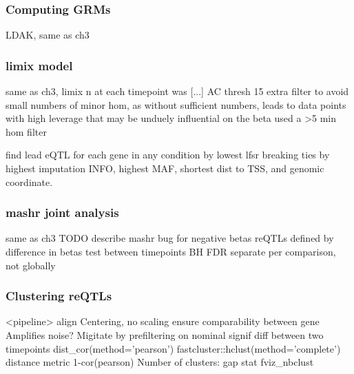 \begin{outline}
\subsubsection{Computing GRMs}

\1 LDAK, same as ch3

\subsubsection{limix model}

\1 same as ch3, limix
    \2 n at each timepoint was [...]
    \2 AC thresh 15
    \2 extra filter to avoid small numbers of minor hom, as without sufficient numbers, leads to data points with high leverage that may be unduely influential on the beta
    \2 used a >5 min hom filter

\1 find lead eQTL for each gene in any condition by lowest lfsr
    \2 breaking ties by highest imputation INFO, highest \gls{MAF}, shortest dist to \gls{TSS}, and genomic coordinate.

\subsubsection{mashr joint analysis}

\1 same as ch3
    \2 TODO describe mashr bug for negative betas
    \2 reQTLs defined by difference in betas test between timepoints
    \2 BH FDR separate per comparison, not globally

\subsubsection{Clustering reQTLs}


\1 <pipeline>
    \2 align
    \2 Centering, no scaling
        \3 ensure comparability between gene
        \3 Amplifies noise? Migitate by prefiltering on nominal signif diff between two timepoints
    \2 dist\_cor(method='pearson')
    \2 fastcluster::hclust(method='complete')
    \2 distance metric 1-cor(pearson)
    \2 Number of clusters: gap stat fviz\_nbclust


\end{outline}
